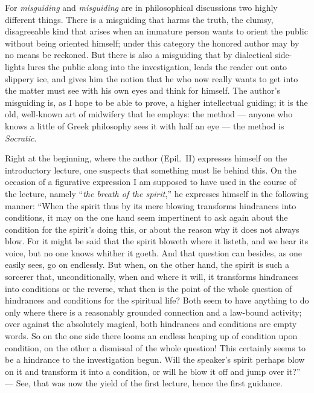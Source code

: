 \documentclass[12pt]{book}
\newcommand{\opage}[1]{\marginnote{\footnotesize\textit{[#1]}}}
\begin{document}
For \emph{misguiding} and \emph{misguiding} are in philosophical
discussions two highly different things. There is a misguiding that
harms the truth, the clumsy, disagreeable kind that arises when an
immature person wants to orient the public without being oriented
himself; under this category the honored author may by no means be
reckoned. But there is also a misguiding that by dialectical side-lights
lures the public along into the investigation, leads the reader out onto
slippery ice, and gives him the notion that he who now really wants to
get into the matter must see with his own eyes and think for himself. The
author's misguiding is, as I hope to be able to prove, a higher
intellectual guiding; it is the old, well-known art of midwifery that he
employs: the method --- anyone who knows a little of Greek philosophy sees
it with half an eye --- the method is \emph{Socratic}.

Right at the beginning, where the author (Epil.\ II) expresses himself
on the introductory lecture, one suspects that something must lie behind
this. On the occasion of a figurative expression I am supposed to have
used in the course of the lecture, namely ``\emph{the breath of the
spirit},'' he expresses himself in the following manner: ``When the
spirit thus by its mere blowing transforms hindrances into conditions,
it may on the one hand seem impertinent to ask again about the condition
for the spirit's doing this, or about the reason why it does not always
blow. For it might be said that the spirit bloweth where it listeth, and
we hear its voice, but no one knows
\opage{312}\setcounter{footnote}{0}%
whither it goeth. And that question can besides, as one easily sees, go
on endlessly. But when, on the other hand, the spirit is such a sorcerer
that, unconditionally, when and where it will, it transforms hindrances
into conditions or the reverse, what then is the point of the whole
question of hindrances and conditions for the spiritual life? Both seem to
have anything to do only where there is a reasonably grounded connection
and a law-bound activity; over against the absolutely magical, both
hindrances and conditions are empty words. So on the one side there
looms an endless heaping up of condition upon condition, on the other a
dismissal of the whole question! This certainly seems to be a hindrance
to the investigation begun. Will the speaker's spirit perhaps blow on it
and transform it into a condition, or will he blow it off and jump over
it?''
--- See, that was now the yield of the first lecture, hence the first
guidance.
\end{document}
